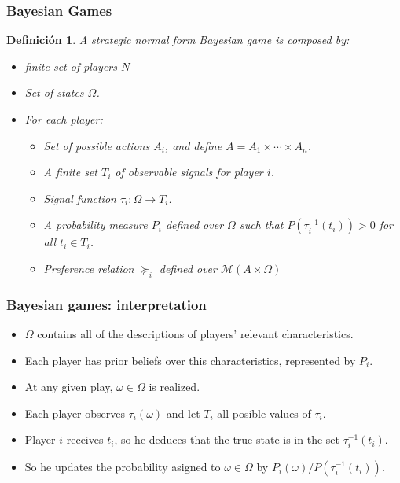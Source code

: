 \documentclass{beamer}
\theoremstyle{plain}
\newtheorem{defi}[teo]{Definición}
\begin{document}
\begin{frame}
\frametitle{Bayesian Games}
\begin{defi}{\label{juegobayesiano}}
A strategic normal form Bayesian game is composed by:
\begin{itemize}
\item finite set of players $N$
\item Set of states $\Omega$.
\item For each player: 
\begin{itemize}
\item Set of possible actions $A_i$,  and define $A = A_1 \times \cdots \times A_n$.
\item A finite set $T_i$ of observable signals for player $i$.
\item Signal function $\tau_i : \Omega \to T_i$.
\item A probability measure $P_i$ defined over $\Omega$ such that $P( \tau^{-1}_i (t_i)) >0$ for all  $t_i \in T_i$.
\item Preference relation $\succeq_i$ defined over  $\mathcal{M}(A \times \Omega)$
\end{itemize}
\end{itemize}
\end{defi}
\end{frame}

\begin{frame}
\frametitle{Bayesian games: interpretation}
\begin{itemize}
\item $\Omega$ contains all of the descriptions of players' relevant characteristics.
\item Each player has prior beliefs over this characteristics, represented by $P_i$.
\item At any given play, $\omega \in \Omega$ is realized.
\item Each player observes $\tau_i(\omega)$ and let $T_i$ all posible values of $\tau_i$.
\item Player $i$ receives $t_i$, so he  deduces that the true state is in the set $\tau_i^{-1}(t_i)$.
\item So he updates the probability asigned to $\omega \in \Omega$ by $P_i(\omega) / P(\tau_i^{-1}(t_i))$.
\end{itemize}
\end{frame}
\end{document}
